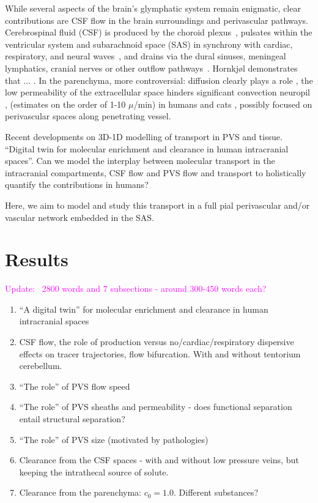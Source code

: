 \documentclass[fleqn,10pt]{wlscirep}
\newcommand{\mer}[1]{\textcolor{magenta}{#1}}
\begin{document}
While several aspects of the brain's glymphatic system remain
enigmatic, clear contributions are CSF flow in the brain surroundings
and perivascular pathways. Cerebrospinal fluid (CSF) is produced by
the choroid plexus~\cite{}, pulsates within the ventricular system and
subarachnoid space (SAS) in synchrony with cardiac, respiratory, and
neural waves~\cite{vinje2019respiratory, fultz2019coupled,
  williams2023xxx}, and drains via the dural sinuses, meningeal
lymphatics, cranial nerves or other outflow
pathways~\cite{proulx2021cerebrospinal}. Hornkjøl demonstrates that
... \cite{hornkjol2022csf}. In the parenchyma, more controversial:
diffusion clearly plays a role \cite{nicolson}, the low permeability
of the extracellular space hinders significant convection neuropil
\cite{holter}, (estimates on the order of 1-10 $\mu$/min) in humans
\cite{vinje2023human} and cats \cite{cserr}, possibly focused on
perivascular spaces along penetrating vessel.

Recent developments on 3D-1D modelling of transport in PVS and
tissue. ``Digital twin for molecular enrichment and clearance in human
intracranial spaces''. Can we model the interplay between
molecular transport in the intracranial compartments, CSF flow and PVS
flow and transport to holistically quantify the contributions in humans?

Here, we aim to model and study this transport in a full pial
perivascular and/or vascular network embedded in the SAS.

\newpage
\section*{Results}
\mer{Update: ~2800 words and 7 subsections - around 300-450 words each?}
\begin{enumerate}
\item
  ``A digital twin'' for molecular enrichment and clearance in human intracranial spaces
\item
  CSF flow, the role of production versus no/cardiac/respiratory
  dispersive effects on tracer trajectories, flow bifurcation. With and without tentorium cerebellum.
\item
  ``The role'' of PVS flow speed
\item
  ``The role'' of PVS sheaths and permeability - does functional separation entail structural separation?
\item
  ``The role'' of PVS size (motivated by pathologies)
\item
  Clearance from the CSF spaces - with and without low pressure veins, but keeping the intrathecal source of solute. 
\item
  Clearance from the parenchyma: $c_0 = 1.0$. Different substances?
\end{enumerate}
\end{document}
